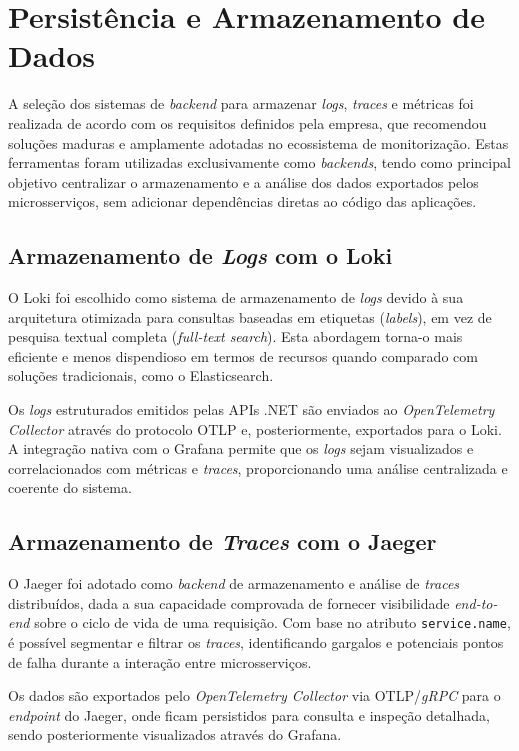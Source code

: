 \section{Persistência e Armazenamento de Dados }

A seleção dos sistemas de \textit{backend} para armazenar \textit{logs}, \textit{traces} e métricas foi realizada de acordo com os requisitos definidos pela empresa, que recomendou soluções maduras e amplamente adotadas no ecossistema de monitorização. Estas ferramentas foram utilizadas exclusivamente como \textit{backends}, tendo como principal objetivo centralizar o armazenamento e a análise dos dados exportados pelos microsserviços, sem adicionar dependências diretas ao código das aplicações.

\subsection{Armazenamento de \textit{Logs} com o Loki}
O Loki foi escolhido como sistema de armazenamento de \textit{logs} devido à sua arquitetura otimizada para consultas baseadas em etiquetas (\textit{labels}), em vez de pesquisa textual completa (\textit{full-text search}). Esta abordagem torna-o mais eficiente e menos dispendioso em termos de recursos quando comparado com soluções tradicionais, como o Elasticsearch. 

Os \textit{logs} estruturados emitidos pelas APIs .NET são enviados ao \textit{OpenTelemetry Collector} através do protocolo OTLP e, posteriormente, exportados para o Loki. A integração nativa com o Grafana permite que os \textit{logs} sejam visualizados e correlacionados com métricas e \textit{traces}, proporcionando uma análise centralizada e coerente do sistema.

\subsection{Armazenamento de \textit{Traces} com o Jaeger}
O Jaeger foi adotado como \textit{backend} de armazenamento e análise de \textit{traces} distribuídos, dada a sua capacidade comprovada de fornecer visibilidade \textit{end-to-end} sobre o ciclo de vida de uma requisição. Com base no atributo \texttt{service.name}, é possível segmentar e filtrar os \textit{traces}, identificando gargalos e potenciais pontos de falha durante a interação entre microsserviços.

Os dados são exportados pelo \textit{OpenTelemetry Collector} via OTLP/\textit{gRPC} para o \textit{endpoint} do Jaeger, onde ficam persistidos para consulta e inspeção detalhada, sendo posteriormente visualizados através do Grafana.

